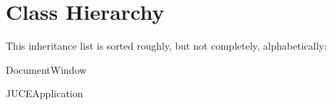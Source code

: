\section{Class Hierarchy}
This inheritance list is sorted roughly, but not completely, alphabetically\+:\begin{DoxyCompactList}
\item Document\+Window\begin{DoxyCompactList}
\item {}
\end{DoxyCompactList}
\item {}
\item J\+U\+C\+E\+Application\begin{DoxyCompactList}
\item {}
\end{DoxyCompactList}
\end{DoxyCompactList}
